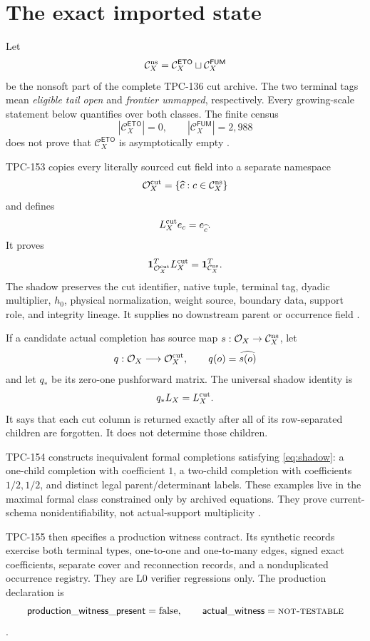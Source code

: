 \documentclass[11pt]{article}
\theoremstyle{definition}
\theoremstyle{remark}
\numberwithin{equation}{section}
\newcommand{\Lzero}{\mathrm{L0}}
\newcommand{\NT}{\textnormal{\textsc{not-testable}}}
\newcommand{\Cns}{\mathcal C_X^{\rm ns}}
\newcommand{\Ceto}{\mathcal C_X^{\mathsf{ETO}}}
\newcommand{\Cfum}{\mathcal C_X^{\mathsf{FUM}}}
\newcommand{\Ocut}{\mathcal O_X^{\rm cut}}
\newcommand{\Occ}{\mathcal O_X}
\newcommand{\one}{\mathbf 1}
\begin{document}
\section{The exact imported state}

Let
\[
 \Cns=\Ceto\sqcup\Cfum
\]
be the nonsoft part of the complete TPC-136 cut archive.  The two
terminal tags mean \emph{eligible tail open} and
\emph{frontier unmapped}, respectively.  Every growing-scale
statement below quantifies over both classes.  The finite census
\[
 |\Ceto|=0,\qquad |\Cfum|=2{,}988
\]
does not prove that \(\Ceto\) is asymptotically empty
\citep{WangTPC143,WangTPC151}.

TPC-153 copies every literally sourced cut field into a separate
namespace
\[
 \Ocut=\{\widehat c:c\in\Cns\}
\]
and defines
\[
 L_X^{\rm cut}e_c=e_{\widehat c}.
\]
It proves
\[
 \one_{\Ocut}^{T}L_X^{\rm cut}
 =\one_{\Cns}^{T}.
\]
The shadow preserves the cut identifier, native tuple, terminal tag,
dyadic multiplier, \(h_0\), physical normalization, weight source,
boundary data, support role, and integrity lineage.  It supplies no
downstream parent or occurrence field \citep{WangTPC153}.

If a candidate actual completion has source map
\(s:\Occ\to\Cns\), let
\[
 q:\Occ\longrightarrow\Ocut,\qquad q(o)=\widehat{s(o)}
\]
and let \(q_*\) be its zero-one pushforward matrix.  The universal
shadow identity is
\begin{equation}
 q_*L_X=L_X^{\rm cut}.
 \label{eq:shadow}
\end{equation}
It says that each cut column is returned exactly after all of its
row-separated children are forgotten.  It does not determine those
children.

TPC-154 constructs inequivalent formal completions satisfying
\eqref{eq:shadow}: a one-child completion with coefficient \(1\), a
two-child completion with coefficients \(1/2,1/2\), and distinct
legal parent/determinant labels.  These examples live in the maximal
formal class constrained only by archived equations.  They prove
current-schema nonidentifiability, not actual-support multiplicity
\citep{WangTPC154}.

TPC-155 then specifies a production witness contract.  Its synthetic
records exercise both terminal types, one-to-one and one-to-many
edges, signed exact coefficients, separate cover and reconnection
records, and a nonduplicated occurrence registry.  They are
\(\Lzero\) verifier regressions only.  The production declaration is
\[
 \mathsf{production\_witness\_present}=\mathrm{false},
 \qquad
\mathsf{actual\_witness}=\NT
\]
\citep{WangTPC155}.
\end{document}
